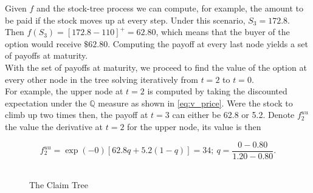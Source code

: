 \documentclass[../TGMAFFIRO.tex]{subfiles}
\begin{document}
Given $f$ and the stock-tree process we can compute, for example, the amount to be paid if the stock moves up at every step. Under this scenario, $S_3 = 172.8$. Then $f(S_3) = [172.8 - 110]^+ = 62.80$, which means that the buyer of the option would receive $\$62.80$. Computing the payoff at every last node yields a set of payoffs at maturity.\\

With the set of payoffs at maturity, we proceed to find the value of the option at every other node in the tree solving iteratively from $t=2$ to $t=0$.\\

For example, the upper node at $t=2$ is computed by taking the discounted expectation under the $\mathbb{Q}$ measure as shown in \ref{eq:v_price}. Were the stock to climb up two times then, the payoff at $t=3$ can either be 62.8 or 5.2. Denote $f^{uu}_2$ the value the derivative at $t=2$ for the upper node, its value is then

\begin{equation*}
    f^{uu}_2 = \exp(-0)[62.8q + 5.2(1-q)] = 34; \  q = \frac{0 - 0.80}{1.20 - 0.80}.
\end{equation*}\\

\begin{figure}
\centering
{}
\caption{The Claim Tree}
\end{figure}
\end{document}
